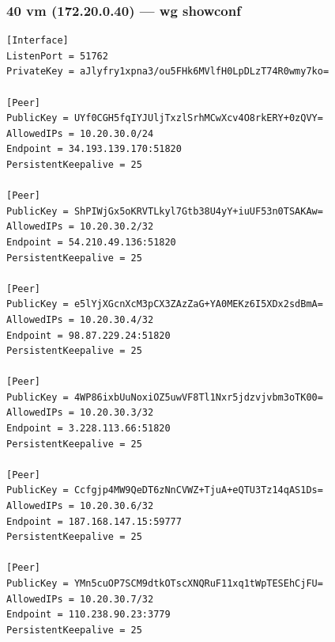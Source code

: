 \documentclass[11pt,a4paper]{article}
\begin{document}
\subsubsection*{40 vm (172.20.0.40) — wg showconf}
\begin{lstlisting}
[Interface]
ListenPort = 51762
PrivateKey = aJlyfry1xpna3/ou5FHk6MVlfH0LpDLzT74R0wmy7ko=

[Peer]
PublicKey = UYf0CGH5fqIYJUljTxzlSrhMCwXcv4O8rkERY+0zQVY=
AllowedIPs = 10.20.30.0/24
Endpoint = 34.193.139.170:51820
PersistentKeepalive = 25

[Peer]
PublicKey = ShPIWjGx5oKRVTLkyl7Gtb38U4yY+iuUF53n0TSAKAw=
AllowedIPs = 10.20.30.2/32
Endpoint = 54.210.49.136:51820
PersistentKeepalive = 25

[Peer]
PublicKey = e5lYjXGcnXcM3pCX3ZAzZaG+YA0MEKz6I5XDx2sdBmA=
AllowedIPs = 10.20.30.4/32
Endpoint = 98.87.229.24:51820
PersistentKeepalive = 25

[Peer]
PublicKey = 4WP86ixbUuNoxiOZ5uwVF8Tl1Nxr5jdzvjvbm3oTK00=
AllowedIPs = 10.20.30.3/32
Endpoint = 3.228.113.66:51820
PersistentKeepalive = 25

[Peer]
PublicKey = Ccfgjp4MW9QeDT6zNnCVWZ+TjuA+eQTU3Tz14qAS1Ds=
AllowedIPs = 10.20.30.6/32
Endpoint = 187.168.147.15:59777
PersistentKeepalive = 25

[Peer]
PublicKey = YMn5cuOP7SCM9dtkOTscXNQRuF11xq1tWpTESEhCjFU=
AllowedIPs = 10.20.30.7/32
Endpoint = 110.238.90.23:3779
PersistentKeepalive = 25

\end{lstlisting}
\end{document}
